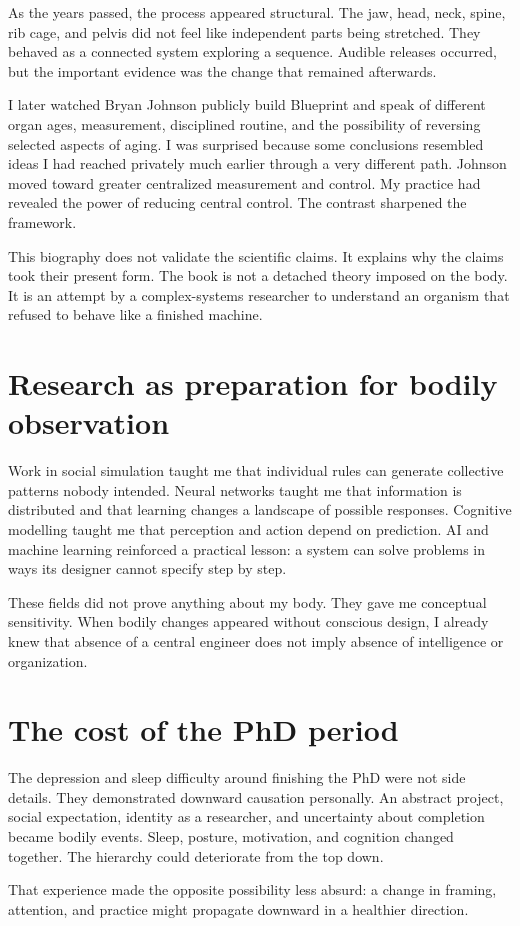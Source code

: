 As the years passed, the process appeared structural. The jaw, head, neck, spine, rib cage, and pelvis did not feel like independent parts being stretched. They behaved as a connected system exploring a sequence. Audible releases occurred, but the important evidence was the change that remained afterwards.

I later watched Bryan Johnson publicly build Blueprint and speak of different organ ages, measurement, disciplined routine, and the possibility of reversing selected aspects of aging. I was surprised because some conclusions resembled ideas I had reached privately much earlier through a very different path. Johnson moved toward greater centralized measurement and control. My practice had revealed the power of reducing central control. The contrast sharpened the framework.

This biography does not validate the scientific claims. It explains why the claims took their present form. The book is not a detached theory imposed on the body. It is an attempt by a complex-systems researcher to understand an organism that refused to behave like a finished machine.

\section{Research as preparation for bodily observation}\label{research-as-preparation-for-bodily-observation}

Work in social simulation taught me that individual rules can generate collective patterns nobody intended. Neural networks taught me that information is distributed and that learning changes a landscape of possible responses. Cognitive modelling taught me that perception and action depend on prediction. AI and machine learning reinforced a practical lesson: a system can solve problems in ways its designer cannot specify step by step.

These fields did not prove anything about my body. They gave me conceptual sensitivity. When bodily changes appeared without conscious design, I already knew that absence of a central engineer does not imply absence of intelligence or organization.

\section{The cost of the PhD period}\label{the-cost-of-the-phd-period}

The depression and sleep difficulty around finishing the PhD were not side details. They demonstrated downward causation personally. An abstract project, social expectation, identity as a researcher, and uncertainty about completion became bodily events. Sleep, posture, motivation, and cognition changed together. The hierarchy could deteriorate from the top down.

That experience made the opposite possibility less absurd: a change in framing, attention, and practice might propagate downward in a healthier direction.
